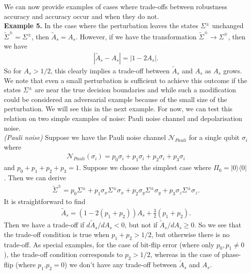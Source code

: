 \documentclass[onecolumn,prx, superscriptaddress,longbibliography,margin=1mm 11pt]{revtex4-2}
\begin{document}
We can now provide examples of cases where trade-offs between robustness accuracy and accuracy occur and when they do not. \\

\noindent \textbf{Example 5.}
    In the case where the perturbation leaves the states $\Sigma^{\pm}$ unchanged $\tilde{\Sigma}^{\pm}=\Sigma^{\pm}$, then $\tilde{A}_s=A_s$. However, if we have the transformation $\tilde{\Sigma}^{\pm} \rightarrow \Sigma^{\mp}$, then we have \\
\begin{align}
    |\tilde{A}_s-A_s|=|1-2A_s|.
\end{align}
So for $A_s>1/2$, this clearly implies a trade-off between $\tilde{A}_s$ and $A_s$ as $A_s$ grows. We note that even a small perturbation is sufficient to achieve this outcome if the states $\Sigma^{\pm}$ are near the true decision boundaries and while such a modification could be considered an adversarial example because of the small size of the perturbation. We will see this in the next example. For now, we can test this relation on two simple examples of noise: Pauli noise channel and depolarisation noise. \\

\noindent \textit{(Pauli noise)} Suppose we have the Pauli noise channel $\mathcal{N}_{Pauli}$ for a single qubit $\sigma_i$ where 
\begin{align}
    \mathcal{N}_{Pauli}(\sigma_i)=p_0 \sigma_i+p_1 \sigma_i+p_2\sigma_i+p_3 \sigma_i
\end{align}
and $p_0+p_1+p_2+p_3=1$. Suppose we choose the simplest case where $\Pi_0=|0\rangle \langle 0|$. Then we can derive
\begin{align}
    \tilde{\Sigma}^{\pm}=p_0 \Sigma^{\pm}+p_1 \sigma_x \Sigma^{\pm}\sigma_x+p_2 \sigma_y \Sigma^{\pm}\sigma_y+p_3\sigma_z \Sigma^{\pm}\sigma_z.
\end{align}
It is straightforward to find
\begin{align}
    \tilde{A}_s=(1-2(p_1+p_2))A_s+\frac{3}{2}(p_1+p_2).
\end{align}
Then we have a trade-off if $d\tilde{A}_s/dA_s<0$, but not if $\tilde{A}_s/dA_s\geq 0$. So we see that the trade-off condition is true when $p_1+p_2>1/2$, but otherwise there is no trade-off. As special examples, for the case of bit-flip error (where only $p_0, p_1 \neq 0$), the trade-off condition corresponds to $p_2>1/2$, whereas in the case of phase-flip (where $p_1. p_2=0$) we don't have any trade-off between $\tilde{A}_s$ and $A_s$. \\
\end{document}
